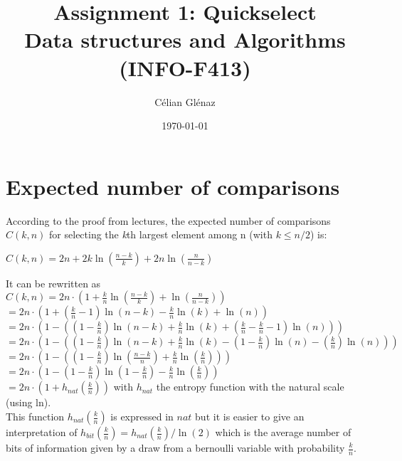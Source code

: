 \documentclass[11pt]{article}
\title{ Assignment 1: Quickselect\\
        \large Data structures and Algorithms (INFO-F413)}
\author{Célian Glénaz}
\date{\today}
\begin{document}
\maketitle	




\section{Expected number of comparisons}

According to the proof from lectures, the expected number of comparisons $C(k,n)$ for selecting the \textit{k}th largest element among n (with $k \leq  n/2$) is:
\newline

$ C(k, n) = 2n + 2k \ln ( \frac{n - k}{k} ) + 2n \ln ( \frac{n}{n - k} ) $
\newline

It can be rewritten as
\\

$ C(k, n) = 2n \cdot ( 1 +  \frac{k}{n} \ln ( \frac{n - k}{k} ) +  \ln ( \frac{n}{n - k} )) $ \\
$ = 2n \cdot ( 1 +  (\frac{k}{n} - 1) \ln ( n - k ) - \frac{k}{n}  \ln ( k ) + \ln(n))$ \\
$ = 2n \cdot ( 1 - (  (1 - \frac{k}{n}) \ln ( n - k ) + \frac{k}{n}  \ln ( k ) + (\frac{k}{n} - \frac{k}{n} - 1)\ln(n)))$ \\
$ = 2n \cdot ( 1 - (  (1 - \frac{k}{n}) \ln ( n - k ) + \frac{k}{n}  \ln ( k ) - (1 - \frac{k}{n})\ln(n)- (\frac{k}{n})\ln(n)))$ \\
$ = 2n \cdot ( 1 - (  (1 - \frac{k}{n}) \ln ( \frac{n - k}{n} ) + \frac{k}{n}  \ln ( \frac{k}{n} )))$ \\
$ = 2n \cdot ( 1 -   (1 - \frac{k}{n}) \ln ( 1 - \frac{k}{n} ) - \frac{k}{n}  \ln ( \frac{k}{n} ))$ \\
$ = 2n \cdot ( 1 + h_{nat}(\frac{k}{n}))$  with $h_{nat}$ the entropy function with the natural scale (using ln). \\



This function $h_{nat}(\frac{k}{n})$ is expressed in $nat$ but it is easier to give an interpretation of $h_{bit}(\frac{k}{n}) = h_{nat}(\frac{k}{n}) / \ln (2) $ which is the average number of bits of information given by a draw from a bernoulli variable with probability $ \frac{k}{n} $.
\end{document}
